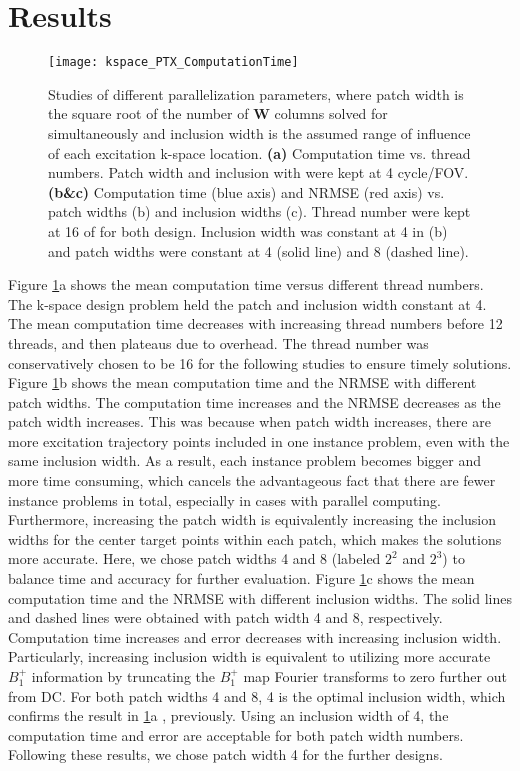 \section*{Results}

\begin{figure}
	\centering
	\texttt{[image: kspace\_PTX\_ComputationTime]}
	\caption{Studies of different parallelization parameters, where patch width is the square root of the number of $\mathbf{W}$ columns solved for simultaneously and inclusion width is the assumed range of influence of each excitation k-space location. \textbf{(a)} Computation time vs. thread numbers. Patch width and inclusion with were kept at 4 cycle/FOV. \textbf{(b\&c)} Computation time (blue axis) and NRMSE (red axis) vs. patch widths (b) and inclusion widths (c). Thread number were kept at 16 of for both design. Inclusion width was constant at 4 in (b) and patch widths were constant at 4 (solid line) and 8 (dashed line).}
	\label{fig:ComputationTime}
\end{figure}
Figure \ref{fig:ComputationTime}a shows the mean computation time versus different thread numbers. The k-space design problem held the patch and inclusion width constant at 4. The mean computation time decreases with increasing thread numbers before 12 threads, and then plateaus due to overhead. The thread number was conservatively chosen to be 16 for the following studies to ensure timely solutions. 
Figure \ref{fig:ComputationTime}b shows the mean computation time and the NRMSE with different patch widths. The computation time increases and the NRMSE decreases as the patch width increases. This was because when patch width increases, there are more excitation trajectory points included in one instance problem, even with the same inclusion width. As a result, each instance problem becomes bigger and more time consuming, which cancels the advantageous fact that there are fewer instance problems in total, especially in cases with parallel computing. Furthermore, increasing the patch width is equivalently increasing the inclusion widths for the center target points within each patch, which makes the solutions more accurate. Here, we chose patch widths 4 and 8 (labeled $2^2$ and $2^3$) to balance time and accuracy for further evaluation.
Figure \ref{fig:ComputationTime}c shows the mean computation time and the NRMSE with different inclusion widths. The solid lines and dashed lines were obtained with patch width 4 and 8, respectively. Computation time increases and error decreases with increasing inclusion width. Particularly, increasing inclusion width is equivalent to utilizing more accurate $B_1^+$ information by truncating the $B_1^+$ map Fourier transforms to zero further out from DC. For both patch widths 4 and 8, 4 is the optimal inclusion width, which confirms the result in \ref{fig:ComputationTime}a , previously. Using an inclusion width of 4, the computation time and error are acceptable for both patch width numbers. Following these results,  we chose patch width 4 for the further designs.

